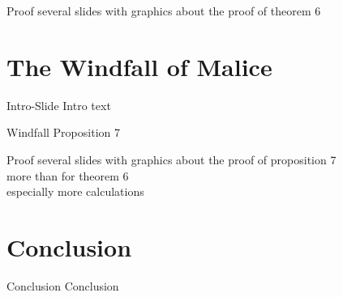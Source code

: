 \documentclass{beamer}
\begin{document}
\begin{frame}{Proof}
	several slides with graphics about the proof of theorem 6
\end{frame}


\section{The Windfall of Malice}

\begin{frame}{Intro-Slide}
	Intro text
\end{frame}

\begin{frame}{Windfall}
	Proposition 7
\end{frame}

\begin{frame}{Proof}
	several slides with graphics about the proof of proposition 7 \\
	more than for theorem 6 \\
	especially more calculations 
\end{frame}


\section{Conclusion}
\begin{frame}{Conclusion}
	Conclusion
\end{frame}
\end{document}
